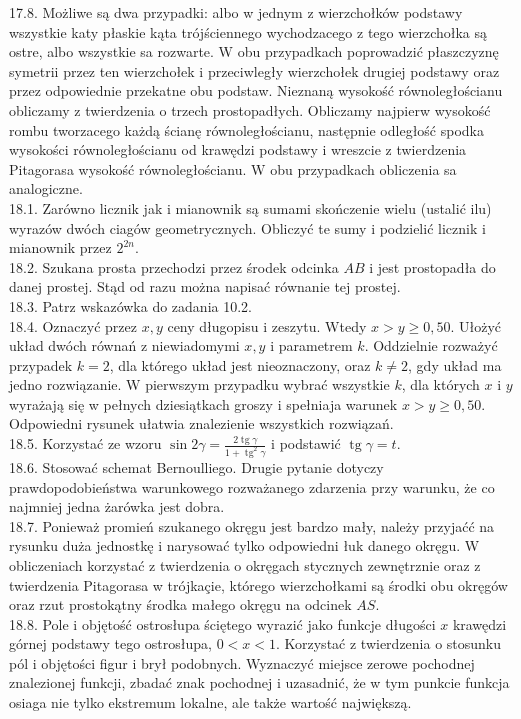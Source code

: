 \documentclass[10pt]{article}
\begin{document}
17.8. Możliwe są dwa przypadki: albo w jednym z wierzchołków podstawy wszystkie katy płaskie kąta trójściennego wychodzacego z tego wierzchołka są ostre, albo wszystkie sa rozwarte. W obu przypadkach poprowadzić płaszczyznę symetrii przez ten wierzchołek i przeciwległy wierzchołek drugiej podstawy oraz przez odpowiednie przekatne obu podstaw. Nieznaną wysokość równoległościanu obliczamy z twierdzenia o trzech prostopadłych. Obliczamy najpierw wysokość rombu tworzacego każdą ścianę równoległościanu, następnie odległość spodka wysokości równoległościanu od krawędzi podstawy i wreszcie z twierdzenia Pitagorasa wysokość równoległościanu. W obu przypadkach obliczenia sa analogiczne.\\
18.1. Zarówno licznik jak i mianownik są sumami skończenie wielu (ustalić ilu) wyrazów dwóch ciagów geometrycznych. Obliczyć te sumy i podzielić licznik i mianownik przez $2^{2 n}$.\\
18.2. Szukana prosta przechodzi przez środek odcinka $A B$ i jest prostopadła do danej prostej. Stąd od razu można napisać równanie tej prostej.\\
18.3. Patrz wskazówka do zadania 10.2.\\
18.4. Oznaczyć przez $x, y$ ceny długopisu i zeszytu. Wtedy $x>y \geq 0,50$. Ułożyć układ dwóch równań z niewiadomymi $x, y$ i parametrem $k$. Oddzielnie rozważyć przypadek $k=2$, dla którego układ jest nieoznaczony, oraz $k \neq 2$, gdy układ ma jedno rozwiązanie. W pierwszym przypadku wybrać wszystkie $k$, dla których $x$ i $y$ wyrażają się w pełnych dziesiątkach groszy i spełniaja warunek $x>y \geq 0,50$. Odpowiedni rysunek ułatwia znalezienie wszystkich rozwiązań.\\
18.5. Korzystać ze wzoru $\sin 2 \gamma=\frac{2 \operatorname{tg} \gamma}{1+\operatorname{tg}^{2} \gamma}$ i podstawić $\operatorname{tg} \gamma=t$.\\
18.6. Stosować schemat Bernoulliego. Drugie pytanie dotyczy prawdopodobieństwa warunkowego rozważanego zdarzenia przy warunku, że co najmniej jedna żarówka jest dobra.\\
18.7. Ponieważ promień szukanego okręgu jest bardzo mały, należy przyjaćć na rysunku duża jednostkę i narysować tylko odpowiedni łuk danego okręgu. W obliczeniach korzystać z twierdzenia o okręgach stycznych zewnętrznie oraz z twierdzenia Pitagorasa w trójkaçie, którego wierzchołkami są środki obu okręgów oraz rzut prostokątny środka małego okręgu na odcinek $A S$.\\
18.8. Pole i objętość ostrosłupa ściętego wyrazić jako funkcje długości $x$ krawędzi górnej podstawy tego ostrosłupa, $0<x<1$. Korzystać z twierdzenia o stosunku pól i objętości figur i brył podobnych. Wyznaczyć miejsce zerowe pochodnej znalezionej funkcji, zbadać znak pochodnej i uzasadnić, że w tym punkcie funkcja osiaga nie tylko ekstremum lokalne, ale także wartość największą.\\
\end{document}
